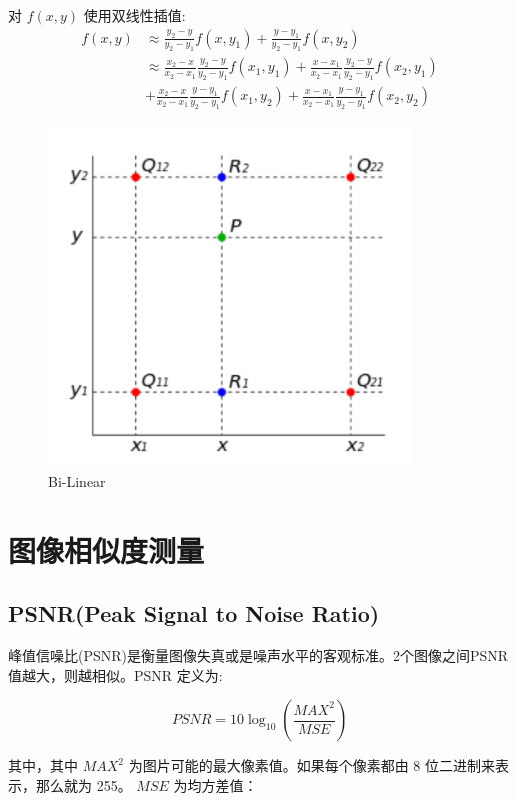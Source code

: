 \documentclass[12pt]{article}
\begin{document}
	对 $f(x, y)$ 使用双线性插值:
	$$
	\begin{aligned}
		f(x, y) & \approx \frac{y_{2}-y}{y_{2}-y_{1}} f\left(x, y_{1}\right)+\frac{y-y_{1}}{y_{2}-y_{1}} f\left(x, y_{2}\right) \\
		& \approx \frac{x_{2}-x}{x_{2}-x_{1}} \frac{y_{2}-y}{y_{2}-y_{1}} f\left(x_{1}, y_{1}\right)+\frac{x-x_{1}}{x_{2}-x_{1}} \frac{y_{2}-y}{y_{2}-y_{1}} f\left(x_{2}, y_{1}\right) \\
		&+\frac{x_{2}-x}{x_{2}-x_{1}} \frac{y-y_{1}}{y_{2}-y_{1}} f\left(x_{1}, y_{2}\right)+\frac{x-x_{1}}{x_{2}-x_{1}} \frac{y-y_{1}}{y_{2}-y_{1}} f\left(x_{2}, y_{2}\right)
	\end{aligned}
	$$
	
	\begin{figure}[H]
		\centering
		\includegraphics[width=3.8in]{./bilinear.png}
		\centering
		\caption{Bi-Linear}
	\end{figure}

	\section{图像相似度测量}
	
	\subsection{PSNR(Peak Signal to Noise Ratio)}
	峰值信噪比(PSNR)是衡量图像失真或是噪声水平的客观标准。2个图像之间PSNR值越大，则越相似。PSNR 定义为:
	
	$$
	P S N R=10 \log _{10}\left(\frac{M A X^{2}}{M S E}\right)
	$$
	
	其中，其中 $MAX^2$ 为图片可能的最大像素值。如果每个像素都由 8 位二进制来表示，那么就为 255。 $MSE$ 为均方差值：
	
\end{document}
